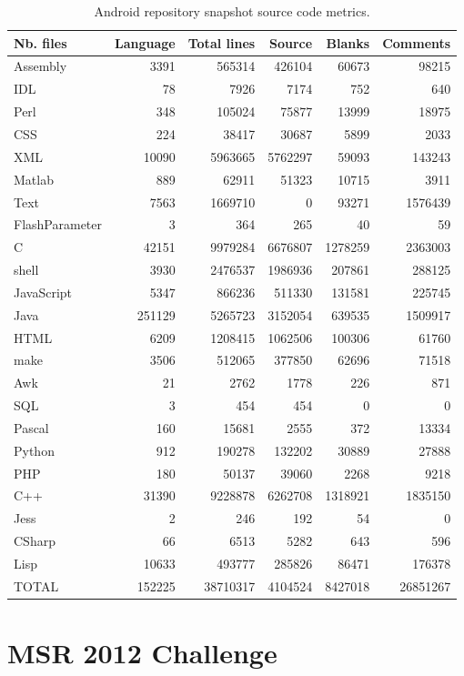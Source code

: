\documentclass[a4paper,10pt]{report}
\numberwithin{equation}{subsection}
\begin{document}
\begin{table}
  \caption{Android repository snapshot source code metrics.}
  \begin{tabularx}{\textwidth}{ | X | r | r | r | r | r |}
  \hline                       
  Nb. files & Language & Total lines & Source & Blanks & Comments \\
  \hline 
  Assembly &3391 & 565314 & 426104 & 60673 & 98215 \\
  IDL & 78 & 7926 & 7174 & 752 & 640 \\
 Perl & 348 & 105024 & 75877 & 13999 & 18975 \\    
  CSS & 224 & 38417 & 30687 & 5899 & 2033 \\
  XML & 10090 & 5963665 & 5762297 & 59093 & 143243 \\   
  Matlab & 889 & 62911 & 51323 & 10715 & 3911 \\
  Text & 7563 & 1669710 & 0 & 93271 & 1576439 \\
  FlashParameter & 3 & 364 & 265 & 40 & 59 \\
  C & 42151 & 9979284 & 6676807 & 1278259 & 2363003 \\   
  shell & 3930 & 2476537 & 1986936 & 207861 & 288125 \\  
  JavaScript & 5347 & 866236 & 511330 & 131581 & 225745 \\   
  Java & 251129 & 5265723 & 3152054 & 639535 & 1509917 \\
  HTML & 6209 & 1208415 & 1062506 & 100306 & 61760 \\
  make & 3506 & 512065 & 377850 & 62696 & 71518 \\
  Awk & 21 & 2762 & 1778 & 226 & 871 \\
  SQL & 3 & 454 & 454 & 0 & 0 \\
  Pascal & 160 & 15681 & 2555 & 372 & 13334 \\      
  Python & 912 & 190278 & 132202 & 30889 & 27888 \\ 
  PHP & 180 & 50137 & 39060 & 2268 & 9218 \\
  C++ & 31390 & 9228878 & 6262708 & 1318921 & 1835150 \\   
  Jess & 2 & 246 & 192 & 54 & 0 \\
  CSharp & 66 & 6513 & 5282 & 643 & 596 \\      
  Lisp & 10633 & 493777 & 285826 & 86471 & 176378 \\
  \hline     
  TOTAL & 152225 & 38710317 & 4104524 & 8427018 & 26851267 \\    
  \hline  
  \end{tabularx}
\end{table}

\section{MSR 2012 Challenge}

\clearpage


\clearpage

\end{document}
